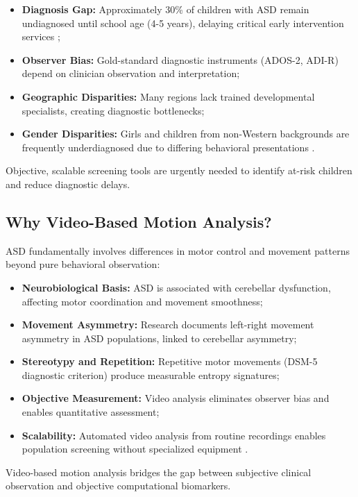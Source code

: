 \documentclass[conference]{IEEEtran}
\begin{document}
\begin{itemize}
\item \textbf{Diagnosis Gap:} Approximately 30\% of children with ASD remain undiagnosed until school age (4-5 years), delaying critical early intervention services \cite{aldhyani2025};
\item \textbf{Observer Bias:} Gold-standard diagnostic instruments (ADOS-2, ADI-R) depend on clinician observation and interpretation;
\item \textbf{Geographic Disparities:} Many regions lack trained developmental specialists, creating diagnostic bottlenecks;
\item \textbf{Gender Disparities:} Girls and children from non-Western backgrounds are frequently underdiagnosed due to differing behavioral presentations \cite{survey2026}.
\end{itemize}

Objective, scalable screening tools are urgently needed to identify at-risk children and reduce diagnostic delays.

\subsection{Why Video-Based Motion Analysis?}

ASD fundamentally involves differences in motor control and movement patterns beyond pure behavioral observation:

\begin{itemize}
\item \textbf{Neurobiological Basis:} ASD is associated with cerebellar dysfunction, affecting motor coordination and movement smoothness;
\item \textbf{Movement Asymmetry:} Research documents left-right movement asymmetry in ASD populations, linked to cerebellar asymmetry;
\item \textbf{Stereotypy and Repetition:} Repetitive motor movements (DSM-5 diagnostic criterion) produce measurable entropy signatures;
\item \textbf{Objective Measurement:} Video analysis eliminates observer bias and enables quantitative assessment;
\item \textbf{Scalability:} Automated video analysis from routine recordings enables population screening without specialized equipment \cite{early_diagnosis2025}.
\end{itemize}

Video-based motion analysis bridges the gap between subjective clinical observation and objective computational biomarkers.
\end{document}
